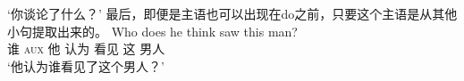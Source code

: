 \glt `你谈论了什么？'
\zl
最后，即便是主语也可以出现在do之前，只要这个主语是从其他小句提取出来的。
\ea
\settowidth{}
\gll Who does he think saw this man?\\   
     谁 \textsc{aux} 他 认为 看见 这 男人\\
\glt `他认为谁看见了这个男人？'
\z
%
%

